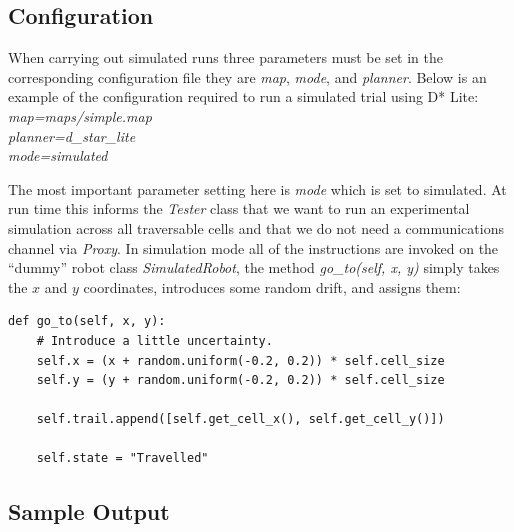 \subsection{Configuration}
\noindent 
When carrying out simulated runs three parameters must be set in the corresponding configuration file they are \textit{map}, \textit{mode}, and \textit{planner}. Below is an example of the configuration required to run a simulated trial using D* Lite: \\

	\indent \textit{map=maps/simple.map \\}
	\indent \textit{planner=d\_star\_lite \\}
	\indent \textit{mode=simulated \\}

\noindent
The most important parameter setting here is \textit{mode} which is set to simulated. At run time this informs the \textit{Tester} class that we want to run an experimental simulation across all traversable cells and that we do not need a communications channel via \textit{Proxy}. In simulation mode all of the instructions are invoked on the ``dummy'' robot class \textit{SimulatedRobot}, the method \textit{go\_to(self, x, y)} simply takes the $x$ and $y$ coordinates, introduces some random drift, and assigns them: \\

\begin{lstlisting}
def go_to(self, x, y):
	# Introduce a little uncertainty.
    self.x = (x + random.uniform(-0.2, 0.2)) * self.cell_size  
    self.y = (y + random.uniform(-0.2, 0.2)) * self.cell_size
    
    self.trail.append([self.get_cell_x(), self.get_cell_y()])
    
    self.state = "Travelled"
\end{lstlisting}

\subsection{Sample Output}

